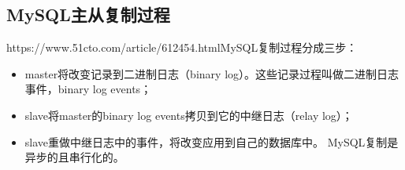 \documentclass[../../../interview-questions.tex]{subfiles}
\begin{document}
\subsection{MySQL主从复制过程}

https://www.51cto.com/article/612454.htmlMySQL复制过程分成三步：

\begin{itemize}
    \item {master将改变记录到二进制日志（binary log）。这些记录过程叫做二进制日志事件，binary log events；}
    \item {slave将master的binary log events拷贝到它的中继日志（relay log）；}
    \item {slave重做中继日志中的事件，将改变应用到自己的数据库中。 MySQL复制是异步的且串行化的。}
\end{itemize}
\end{document}
